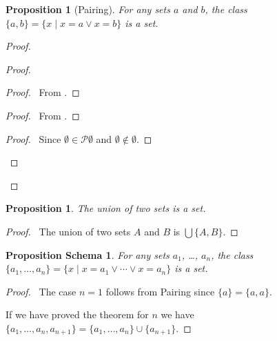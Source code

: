 \documentclass{book}
\let\qed\relax
\newtheorem{prop}[ax]{Proposition}
\newtheorem{props}[ax]{Proposition Schema}
\theoremstyle{definition}
\begin{document}
\begin{prop}[Pairing]
For any sets $a$ and $b$, the class $\{a,b\} = \{x \mid x = a \vee x = b\}$ is a set.
\end{prop}

\begin{proof}
\pf
{}
\begin{proof}
	\begin{proof}
		\pf\ From .
	\end{proof}
	\begin{proof}
		\pf\ From .
	\end{proof}
	\begin{proof}
		\pf\ Since $\emptyset \in \mathcal{P} \emptyset$ and $\emptyset \notin \emptyset$.
	\end{proof}
\end{proof}
\qed
\end{proof}

\begin{prop}
The union of two sets is a set.
\end{prop}

\begin{proof}
\pf\ The union of two sets $A$ and $B$ is $\bigcup \{A,B\}$. \qed
\end{proof}

\begin{props}
For any sets $a_1$, \ldots, $a_n$, the class $\{a_1, \ldots, a_n\} = \{x \mid x = a_1 \vee \cdots \vee x = a_n\}$ is a set.
\end{props}

\begin{proof}
\pf\ The case $n=1$ follows from Pairing since $\{a\} = \{a,a\}$.

If we have proved the theorem for $n$ we have $\{a_1, \ldots, a_n, a_{n+1}\} = \{a_1, \ldots, a_n\} \cup \{a_{n+1}\}$. \qed
\end{proof}
\end{document}
